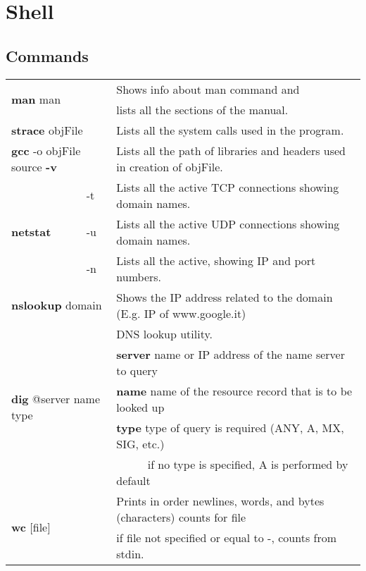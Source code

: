 \chapter{Shell}

\section{Commands}

\begin{table}[h]
\centering
\footnotesize
\begin{tabular}{|l|l|l|}
\hline
\multicolumn{2}{|l|}{\multirow{2}{*}{\textbf{man} man}}&{Shows info about man command and}\\
\multicolumn{2}{|l|}{} & {lists all the sections of the manual.}\\
\hline
\multicolumn{2}{|l|}{\textbf{strace} objFile} & {Lists all the system calls used in the program.}\\
\hline
\multicolumn{2}{|l|}{\textbf{gcc} -o objFile source \textbf{-v}} & {Lists all the path of libraries and headers used in creation of objFile.}\\
\hline
\multirow{3}{*}{\textbf{netstat}} & {-t} & {Lists all the active TCP connections showing domain names.}\\
\cline{2-3}
& {-u} & {Lists all the active UDP connections showing domain names.}\\
\cline{2-3}
& {-n} & {Lists all the active, showing IP and port numbers.}\\
\hline
\multicolumn{2}{|l|}{\textbf{nslookup} domain} & {Shows the IP address related to the domain (E.g. IP of www.google.it)}\\
\hline
\multicolumn{2}{|l|}{\multirow{5}{*}{\textbf{dig} @server name type}}&{DNS lookup utility.}\\
\multicolumn{2}{|l|}{}&{\textbf{server} name or IP address of the name server to query}\\
\multicolumn{2}{|l|}{}&{\textbf{name} name of the resource record that is to be looked up}\\
\multicolumn{2}{|l|}{}&{\textbf{type} type of query is required (ANY, A, MX, SIG, etc.)}\\
\multicolumn{2}{|l|}{}&{$\;\;\;\;\;\;\;\;\;\;$if no type is specified, A is performed by default}\\
\hline
\multicolumn{2}{|l|}{\multirow{2}{*}{\textbf{wc} [file]}} & {Prints in order newlines, words, and bytes (characters) counts for file}\\
\multicolumn{2}{|l|}{} & {if file not specified or equal to -, counts from stdin.}\\

\end{tabular}
\end{table}
